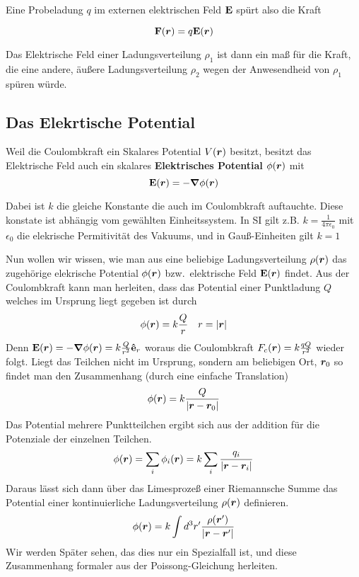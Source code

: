 Eine Probeladung $q$ im externen elektrischen Feld $\vb E$ spürt also die Kraft

\begin{equation}
  \vb F(\vb*r) = q \vb E(\vb*r)
\end{equation}

Das Elektrische Feld einer Ladungsverteilung $\rho_1$ ist dann ein 
maß für die Kraft, die eine andere, äußere Ladungsverteilung $\rho_2$ 
wegen der Anwesendheid von $\rho_1$ spüren würde. 

\subsection{Das Elekrtische Potential}%
\label{ssub:E-pot}
Weil die Coulombkraft ein
Skalares Potential $V(\vb*r)$ besitzt, 
besitzt das Elektrische Feld auch ein skalares \textbf{Elektrisches Potential}
$\phi(\vb*r)$ mit
\begin{equation}
  \vb E(\vb*r)=-\grad \phi(\vb*r)
\end{equation}

Dabei ist $k$ die gleiche Konstante die auch im Coulombkraft auftauchte. Diese
konstate ist abhängig vom gewählten Einheitssystem. In SI gilt z.B. 
$k=\frac{1}{4\pi\epsilon_0}$ mit $\epsilon_0$ die elekrische Permitivität des
Vakuums, und in Gauß-Einheiten gilt $k=1$

Nun wollen wir wissen, wie man aus eine beliebige 
Ladungsverteilung $\rho(\vb*r)$ das zugehörige
elekrische Potential $\phi(\vb*r)$ bzw.\ elektrische Feld $\vb E(\vb*r)$ 
findet. Aus der Coulombkraft kann man herleiten, dass das Potential
einer Punktladung $Q$ welches im Ursprung liegt gegeben ist durch
\begin{equation*}
  \phi(\vb*r) = k  \frac{Q}{r} \quad r=\abs{\vb*r}
\end{equation*}
Denn $\vb E(\vb*r)=-\grad\phi(\vb*r)=k \frac{Q}{r^2}\vu e_r $ 
woraus die Coulombkraft $F_c(\vb*r)=k \frac{qQ}{r^2}$ wieder folgt.
Liegt das Teilchen nicht im Ursprung, sondern am beliebigen Ort, $\vb*r_0$
so findet man den Zusammenhang (durch eine einfache Translation)
\begin{equation*}
  \phi(\vb*r) = k \frac{Q}{\abs{\vb*r - \vb*r_0}}
\end{equation*}
Das Potential mehrere Punktteilchen ergibt sich aus der addition für die 
Potenziale der einzelnen Teilchen.
\begin{equation*}
  \phi(\vb*r) = \sum_i \phi_i(\vb*r) = k\sum_i \frac{q_i}{\abs{\vb*r-\vb*r_i}}
\end{equation*}
Daraus lässt sich dann über das Limesprozeß einer Riemannsche Summe das 
Potential einer kontinuierliche Ladungsverteilung $\rho(\vb*r)$ definieren.
\begin{equation}
  \label{eq:potential}
  \phi(\vb*r) = k \int d^3 r' \frac{\rho(\vb*r')}{\abs{\vb*r-\vb*r'}} 
\end{equation}
Wir werden Später sehen, das dies nur ein Spezialfall ist, und diese
Zusammenhang formaler aus der Poissong-Gleichung herleiten.

